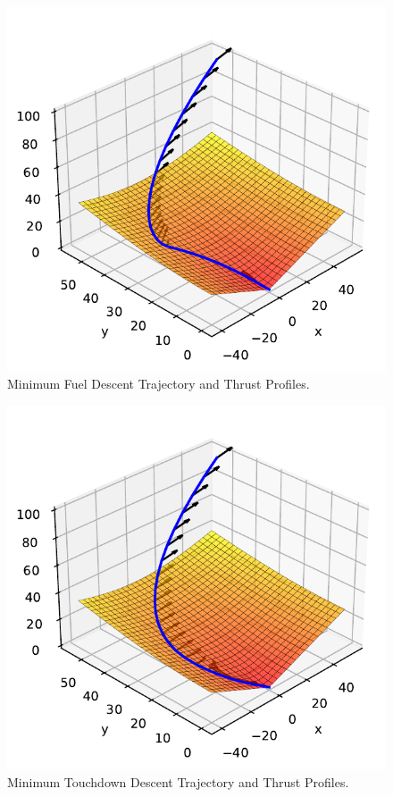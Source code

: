 \documentclass[12pt,reqno]{article}
\theoremstyle{definition}
\numberwithin{equation}{section}
\begin{document}
    \begin{figure}[htbp]
        \centering
        \includegraphics[width=\linewidth]{../examples/364a/rocket_min_fuel.pdf}
        \caption{Minimum Fuel Descent Trajectory and Thrust Profiles.}
        \label{fig:364a-min-fuel-desc}
    \end{figure}


    \begin{figure}[htbp]
        \centering
        \includegraphics[width=\linewidth]{../examples/364a/rocket_min_descent.pdf}
        \caption{Minimum Touchdown Descent Trajectory and Thrust Profiles.}
        \label{fig:364a-min-touchdown-desc}
    \end{figure}

\printbibliography
\end{document}
